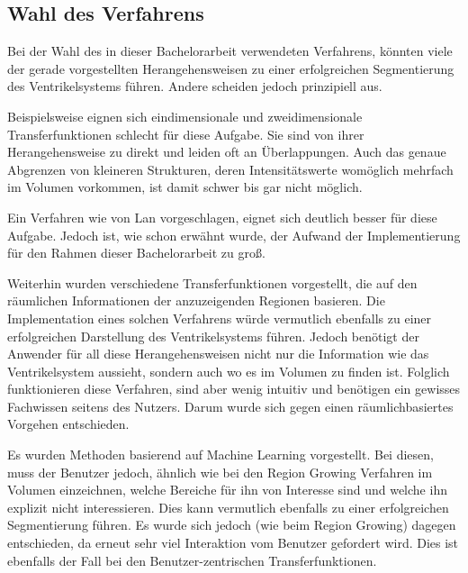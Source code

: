 \subsection{Wahl des Verfahrens}


Bei der Wahl des in dieser Bachelorarbeit verwendeten Verfahrens, könnten viele der gerade vorgestellten Herangehensweisen zu einer erfolgreichen Segmentierung des Ventrikelsystems führen. Andere scheiden jedoch prinzipiell aus.


Beispielsweise eignen sich eindimensionale und zweidimensionale Transferfunktionen schlecht für diese Aufgabe. Sie sind von ihrer Herangehensweise zu direkt und leiden oft an Überlappungen. Auch das genaue Abgrenzen von kleineren Strukturen, deren Intensitätswerte womöglich mehrfach im Volumen vorkommen, ist damit schwer bis gar nicht möglich.


Ein Verfahren wie von Lan \cite{lan2017improving} vorgeschlagen, eignet sich deutlich besser für diese Aufgabe. Jedoch ist, wie schon erwähnt wurde, der Aufwand der Implementierung für den Rahmen dieser Bachelorarbeit zu groß.


Weiterhin wurden verschiedene Transferfunktionen vorgestellt, die auf den räumlichen Informationen der anzuzeigenden Regionen basieren. Die Implementation eines solchen Verfahrens würde vermutlich ebenfalls zu einer erfolgreichen Darstellung des Ventrikelsystems führen. Jedoch benötigt der Anwender für all diese Herangehensweisen nicht nur die Information wie das Ventrikelsystem aussieht, sondern auch wo es im Volumen zu finden ist. Folglich funktionieren diese Verfahren, sind aber wenig intuitiv und benötigen ein gewisses Fachwissen seitens des Nutzers. Darum wurde sich gegen einen räumlichbasiertes Vorgehen entschieden.


Es wurden Methoden basierend auf Machine Learning vorgestellt. Bei diesen, muss der Benutzer jedoch, ähnlich wie bei den Region Growing Verfahren im Volumen einzeichnen, welche Bereiche für ihn von Interesse sind und welche ihn explizit nicht interessieren.
Dies kann vermutlich ebenfalls zu einer erfolgreichen Segmentierung führen. Es wurde sich jedoch (wie beim Region Growing) dagegen entschieden, da erneut sehr viel Interaktion vom Benutzer gefordert wird.
Dies ist ebenfalls der Fall bei den Benutzer-zentrischen Transferfunktionen.


